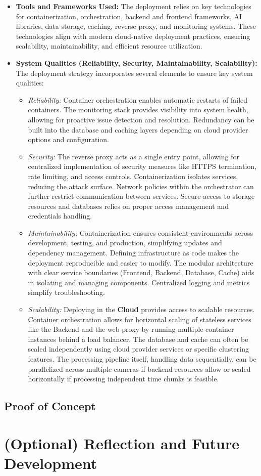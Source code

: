 \begin{itemize}
    \item \textbf{Tools and Frameworks Used:}
        The deployment relies on key technologies for containerization, orchestration, backend and frontend frameworks, AI libraries, data storage, caching, reverse proxy, and monitoring systems. These technologies align with modern cloud-native deployment practices, ensuring scalability, maintainability, and efficient resource utilization.

    \item \textbf{System Qualities (Reliability, Security, Maintainability, Scalability):}
        The deployment strategy incorporates several elements to ensure key system qualities:
        \begin{itemize}
            \item \textit{Reliability:} Container orchestration enables automatic restarts of failed containers. The monitoring stack provides visibility into system health, allowing for proactive issue detection and resolution. Redundancy can be built into the database and caching layers depending on cloud provider options and configuration.
            \item \textit{Security:} The reverse proxy acts as a single entry point, allowing for centralized implementation of security measures like HTTPS termination, rate limiting, and access controls. Containerization isolates services, reducing the attack surface. Network policies within the orchestrator can further restrict communication between services. Secure access to storage resources and databases relies on proper access management and credentials handling.
            \item \textit{Maintainability:} Containerization ensures consistent environments across development, testing, and production, simplifying updates and dependency management. Defining infrastructure as code makes the deployment reproducible and easier to modify. The modular architecture with clear service boundaries (Frontend, Backend, Database, Cache) aids in isolating and managing components. Centralized logging and metrics simplify troubleshooting.
            \item \textit{Scalability:} Deploying in the \textbf{Cloud} provides access to scalable resources. Container orchestration allows for horizontal scaling of stateless services like the Backend and the web proxy by running multiple container instances behind a load balancer. The database and cache can often be scaled independently using cloud provider services or specific clustering features. The processing pipeline itself, handling data sequentially, can be parallelized across multiple cameras if backend resources allow or scaled horizontally if processing independent time chunks is feasible.
        \end{itemize}
\end{itemize}

\subsection{Proof of Concept}
\label{subsection:poc} %

\section{(Optional) Reflection and Future Development}
\label{section:reflection} %
